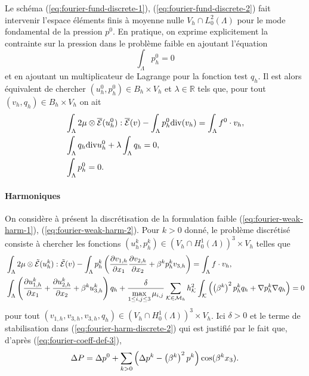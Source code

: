 Le schéma (\ref{eq:fourier-fund-discrete-1}),
(\ref{eq:fourier-fund-discrete-2}) fait intervenir l'espace
éléments finis à moyenne nulle $V_h \cap L^2_0(\Lambda)$ pour le mode
fondamental de la pression $p^0$. En pratique, on exprime
explicitement la contrainte sur la pression dans le problème faible
en ajoutant l'équation
\begin{equation}
\int_\Lambda p^0_h = 0
\end{equation}
et en ajoutant un multiplicateur de Lagrange pour la fonction test $q_h$. Il est alors équivalent
de chercher $(u^0_h, p^0_h)\in B_h\times V_h$ et
$\lambda\in\mathbb R$ tels que, pour tout $(v_h, q_h)\in
B_h\times V_h$ on ait
\begin{align}
  &\int_\Lambda
  2\mu\otimes\overline{\mathcal E}(u^0_h):\overline{\mathcal E}(v)
  -\int_\Lambda p^0_h\mathrm{div}(v_h) = \int_\Lambda f^0\cdot v_h, \label{eq:fourier-fund-discrete-1-prat}\\
  & \int_\Lambda q_h\mathrm{div} u^0_h + \lambda \int_\Lambda q_h =
  0,\label{eq:fourier-fund-discrete-2-prat}\\
  & \int_\Lambda p_h^0 = 0.\label{eq:fourier-fund-discrete-3-prat}
\end{align}

\paragraph{Harmoniques}
On considère à présent la discrétisation de la formulation
faible (\ref{eq:fourier-weak-harm-1}),
(\ref{eq:fourier-weak-harm-2}). Pour $k > 0$ donné, le problème
discrétisé consiste à chercher les fonctions $(u^k_h, p^k_h) \in
(V_h\cap H_0^1(\Lambda))^3\times V_h$ telles que
\begin{align}
  &\int_\Lambda 2\mu\otimes
  \tilde{\mathcal E}(u^k_h):\tilde{\mathcal E}(v) - \int_\Lambda
  p_h^k\left( \frac{\partial v_{1,h}}{\partial x_1}
    \frac{\partial v_{2,h}}{\partial x_2} +\beta^k p^k_h v_{3,h} \right) =
  \int_\Lambda f\cdot v_h,\label{eq:fourier-harm-discrete-1}\\
  &\int_\Lambda \left( \frac{\partial u^k_{1,h}}{\partial x_1} +
    \frac{\partial u^k_{2,h}}{\partial x_2} + \beta^k u^k_{3,h} \right)q_h +
  \frac{\delta}{\displaystyle\max_{1\leq i,j\leq 3}\mu_{i,j}} \sum_{{\mathcal K}\in\mathcal M_h} h_{\mathcal K}^2
  \int_{\mathcal K}\left( \left( \beta^k \right)^2 p^k_h q_h + \nabla p_h^k \nabla
    q_h \right) = 0\label{eq:fourier-harm-discrete-2}
\end{align}
pour tout $(v_{1,h}, v_{3,h}, v_{3,h}, q_h) \in (V_h\cap
H_0^1(\Lambda))^3\times V_h$. Ici $\delta > 0$ et le terme de
stabilisation dans (\ref{eq:fourier-harm-discrete-2}) qui est justifié
par le fait que, d'après (\ref{eq:fourier-coeff-def-3}),
\begin{equation}
  \Delta P = \Delta p^0 + \sum_{k > 0} \left( \Delta p^k -
  \left( \beta^k \right)^2 p^k \right)\cos(\beta^k x_3).
\end{equation}

